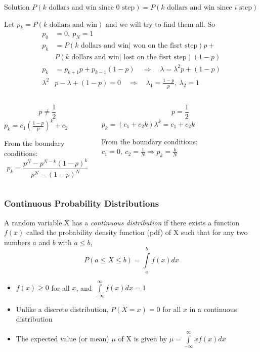 \documentclass[fullscreen=true, bookmarks=true, hyperref={pdfencoding=unicode}]{beamer}
\begin{document}
\begin{frame}
  \begin{block}{Solution}
    \pause\small
    $P(k \text{ dollars and win since }0\text{ step}) = 
     P(k \text{ dollars and win since }i\text{ step})$
    
     \pause
     Let $p_k = P(k \text{ dollars and win})$ and we will try to find them all. So 
     \pause
     \begin{align*}
      p_0 &= 0,\ p_N = 1 \\
      p_k &= P(k \text{ dollars and win}|\text{ won on the fisrt step})p + \\ 
      &P(k \text{ dollars and win}|\text{ lost on the fisrt step})(1-p) \\
      p_k &= p_{k+1}p + p_{k-1}(1-p) \quad\Rightarrow\quad \lambda = \lambda^2 p + (1-p) \\
      \lambda^2 &p - \lambda + (1-p) = 0 \quad\Rightarrow\quad \lambda_1 = \frac{1-p}{p},\ \lambda_2 = 1
     \end{align*}
  
    \begin{columns}
      \begin{column}{0.5\textwidth}
        \pause
        $$p \neq \frac{1}{2}$$
        $p_k = c_1\left(\frac{1-p}{p}\right)^k + c_2$

        From the boundary conditions:
        $$\boxed{ p_k = \frac{p^N - p^{N-k}(1-p)^k}{p^N - (1-p)^N}}$$
      \end{column}
      \begin{column}{0.5\textwidth}
        \pause
        $$p = \frac{1}{2}$$
        $p_k = \left(c_1 + c_2k\right) \lambda^k = c_1 + c_2k$
        
        From the boundary conditions:
        $c_1 = 0, \ c_2 = \frac{1}{N} \Rightarrow \boxed{p_k = \frac{k}{N}}$
      \end{column}
    \end{columns}
  \end{block}
\end{frame}


\begin{frame}
  \frametitle{Continuous Probability Distributions}
  
  \pause
  \begin{definition}
  A random variable X has a \textit{continuous distribution} if there exists a function $f(x)$ called the probability density function (pdf) of X such that for any two numbers $a$ and $b$ with $a \leq b$, 
  \[ P(a \leq X \leq b) = \int\limits_{a}^{b} f(x) dx \]
  \end{definition}
  
  \begin{itemize}
    \pause\item $f(x) \geq 0$ for all $x$, and $\int\limits_{-\infty}^{\infty} f(x) dx = 1$
    \pause\item Unlike a discrete distribution, $P(X = x) = 0$ for all $x$ in a continuous distribution
    \pause\item The expected value (or mean) $\mu$ of X is given by $\mu = \int\limits_{-\infty}^{\infty} x f(x) dx$
  \end{itemize}  
\end{frame}
\end{document}
